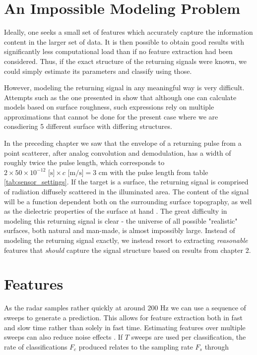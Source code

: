 \section{An Impossible Modeling Problem}\label{sec:chall}


Ideally, one seeks a small set of features which accurately capture the information content in the larger set of data. It is then possible to obtain good results with significantly less computational load than if no feature extraction had been considered. Thus, if the exact structure of the returning signals were known, we could simply estimate its parameters and classify using those.

However, modeling the returning signal in any meaningful way is very difficult. Attempts such as the one presented in \citep{fung_li_chen_1992} show that although one can calculate models based on surface roughness, such expressions rely on multiple approximations that cannot be done for the present case where we are consdiering 5 different surface with differing structures. 

In the preceding chapter we saw that the envelope of a returning pulse from a point scatterer, after analog convolution and demodulation, has a width of roughly twice the pulse length, which corresponds to $2\times50\times 10^{-12}\text{ [s]}\times c \text{ [m/s]}= 3$ cm with the pulse length from table \ref{tab:sensor_settings}. If the target is a surface, the returning signal is comprised of radiation diffusely scattered in the illuminated area. The content of the signal will be a function dependent both on the surrounding surface topography, as well as the dielectric properties of the surface at hand \citep{grossman_popovic_chamberlin_gordon_novotny_2017}. The great difficulty in modeling this returning signal is clear - the universe of all possible "realistic" surfaces, both natural and man-made, is almost impossibly large. Instead of modeling the returning signal exactly, we instead resort to extracting \emph{reasonable} features that \emph{should} capture the signal structure based on results from chapter 2.  

\section{Features}

As the radar samples rather quickly at around 200 Hz we can use a sequence of sweeps to generate a prediction. This allows for feature extraction both in fast and slow time rather than solely in fast time. Estimating features over multiple sweeps can also reduce noise effects \citep{w_doerry_2016}. If $T$ sweeps are used per classification, the rate of classifications $F_c$ produced relates to the sampling rate $F_s$ through

